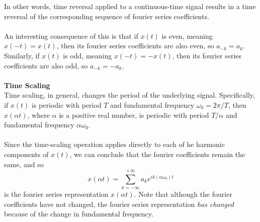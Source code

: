 \documentclass{report}
\begin{document}
In other words, time reversal applied to a continuous-time signal results in a time reversal of the corresponding sequence of fourier series coefficients.\\
\vspace{1mm}\\
An interesting consequence of this is that
if $x(t)$ is even, meaning $x(-t)=x(t)$, then its fourier series coefficients are also even, so
$a_{-k}=a_k$. Similarly, if $x(t)$ is odd, meaning $x(-t)=-x(t)$, then its fourier series coefficients are also odd, so $a_{-k}=-a_k$.\\
\vspace{1mm}\\
\textbf{Time Scaling}\\
Time scaling, in general, changes the period of the underlying signal.
Specifically, if $x(t)$ is periodic with period $T$ and fundamental frequency $\omega_0=2\pi/T$, then
$x(\alpha t)$, where $\alpha$ is a positive real number, is periodic with period $T/\alpha$ and fundamental frequency $\alpha\omega_0$.\\
\vspace{1mm}\\
Since the time-scaling operation applies directly to each of he harmonic components of $x(t)$, we can conclude that the fourier coefficients remain the same, and so
\begin{equation*}
x(\alpha t)=\sum^{+\infty}_{k=-\infty}a_ke^{ik(\alpha\omega_0)t}
\end{equation*}
is the fourier series representation $x(\alpha t)$. Note that although the fourier coefficients have not changed, the fourier series representation \textit{has changed} because of the change
in fundamental frequency.
\newpage
\end{document}

